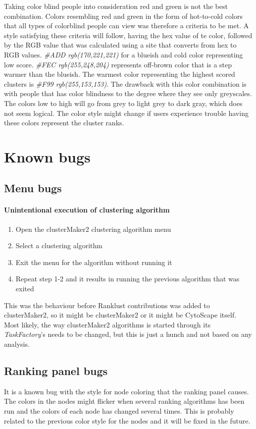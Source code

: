 Taking color blind people into consideration red and green is not the
best combination. Colors resembling red and green in the form of hot-to-cold
colors that all types of colorblind people can view was therefore a criteria to
be met. A style satisfying these criteria will follow, having the hex value of
te color\cite{color-blindness3}, followed by the RGB value that was calculated
using a site that converts from hex to RGB values\cite{color-blindness2}.
\textit{#ADD rgb(170,221,221)} for a blueish and cold color representing low
score. \textit{#FEC rgb(255,248,204)} represents off-brown color that is a step
warmer than the blueish. The warmest color representing the highest scored
clusters is \textit{#F99 rgb(255,153,153)}. The drawback with this color
combination is with people that has color blindness to the degree where they see
only greyscales. The colors low to high will go from grey to light grey to dark
gray, which does not seem logical. The color style might change if users
experience trouble having these colors represent the cluster ranks. 

\section{Known bugs}
\subsection{Menu bugs}
\paragraph{Unintentional execution of clustering algorithm}
\begin{enumerate}
    \item Open the clusterMaker2 clustering algorithm menu
    \item Select a clustering algorithm
    \item Exit the menu for the algorithm without running it
    \item Repeat step 1-2 and it results in running the previous algorithm that
        was exited
\end{enumerate}
This was the behaviour before Ranklust contributions was added to clusterMaker2,
so it might be clusterMaker2 or it might be CytoScape itself. Most likely, the
way clusterMaker2 algorithms is started through its \textit{TaskFactory}'s needs
to be changed, but this is just a hunch and not based on any analysis.

\subsection{Ranking panel bugs}
It is a known bug with the style for node coloring that the ranking panel
causes. The colors in the nodes might flicker when several ranking algorithms
has been run and the colors of each node has changed several times. This is
probably related to the previous color style for the nodes and it will be fixed
in the future.
